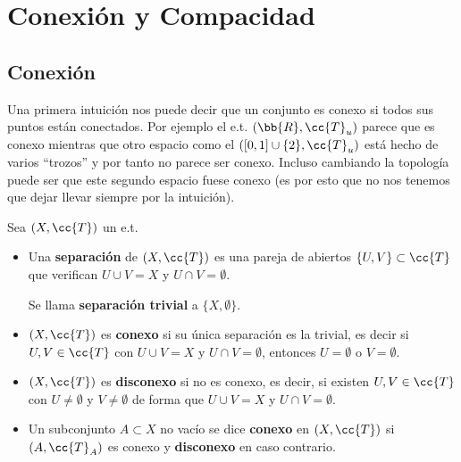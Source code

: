 \chapter{Conexión y Compacidad}

\section{Conexión}
Una primera intuición nos puede decir que un conjunto es conexo si todos sus puntos están conectados. Por ejemplo el e.t. $(\bb{R}, \cc{T}_u)$ parece que es conexo mientras que otro espacio como el $([0,1]\cup\{2\}, \cc{T}_u)$ está hecho de varios ``trozos'' y por tanto no parece ser conexo. Incluso cambiando la topología puede ser que este segundo espacio fuese conexo (es por esto que no nos tenemos que dejar llevar siempre por la intuición).

\begin{definicion}
    Sea $(X, \cc{T})$ un e.t.
    \begin{itemize}
        \item Una \textbf{separación} de $(X, \cc{T})$ es una pareja de abiertos $\{U,V\}\subset \cc{T}$ que verifican $U\cup V = X$ y $U\cap V = \emptyset$.
        
        Se llama \textbf{separación trivial} a $\{X, \emptyset\}$.
        \item $(X, \cc{T})$ es \textbf{conexo} si su única separación es la trivial, es decir si $U,V\in \cc{T}$ con $U\cup V = X$ y $U\cap V = \emptyset$, entonces $U=\emptyset$ o $V=\emptyset$.
        \item $(X, \cc{T})$ es \textbf{disconexo} si no es conexo, es decir, si existen $U,V\in \cc{T}$ con $U\neq \emptyset$ y $V\neq \emptyset$ de forma que $U\cup V = X$ y $U\cap V = \emptyset$.
        \item Un subconjunto $A\subset X$ no vacío se dice \textbf{conexo} en $(X, \cc{T})$ si $(A, \cc{T}_A)$ es conexo y \textbf{disconexo} en caso contrario.
    \end{itemize}
    \endsquare
\end{definicion}

